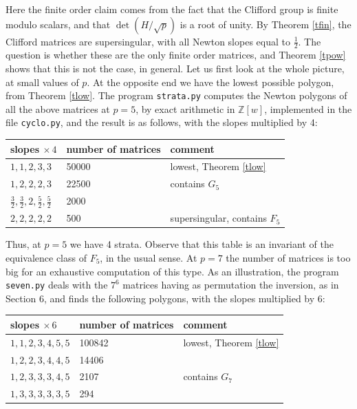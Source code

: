 \documentclass[11pt]{amsart}
\theoremstyle{definition}
\begin{document}
Here the finite order claim comes from the fact that the Clifford group is finite modulo scalars, and that $\det(H/\sqrt{p})$ is a root of unity. By Theorem \ref{tfin}, the Clifford matrices are supersingular, with all Newton slopes equal to $\frac{1}{2}$. The question is whether these are the only finite order matrices, and Theorem \ref{tpow} shows that this is not the case, in general. Let us first look at the whole picture, at small values of $p$. At the opposite end we have the lowest possible polygon, from Theorem \ref{tlow}. The program \texttt{strata.py} computes the Newton polygons of all the above matrices at $p=5$, by exact arithmetic in $\mathbb Z[w]$, implemented in the file \texttt{cyclo.py}, and the result is as follows, with the slopes multiplied by 4:
\begin{center}
\begin{tabular}[t]{|l|l|l|}
\hline
slopes $\times\,4$&number of matrices&comment\\
\hline
$1,1,2,3,3$&50000&lowest, Theorem \ref{tlow}\\
\hline
$1,2,2,2,3$&22500&contains $G_5$\\
\hline
$\frac{3}{2},\frac{3}{2},2,\frac{5}{2},\frac{5}{2}$&2000&\\
\hline
$2,2,2,2,2$&500&supersingular, contains $F_5$\\
\hline
\end{tabular}
\end{center}

\medskip

Thus, at $p=5$ we have 4 strata. Observe that this table is an invariant of the equivalence class of $F_5$, in the usual sense. At $p=7$ the number of matrices is too big for an exhaustive computation of this type. As an illustration, the program \texttt{seven.py} deals with the $7^6$ matrices having as permutation the inversion, as in Section 6, and finds the following polygons, with the slopes multiplied by 6:
\begin{center}
\begin{tabular}[t]{|l|l|l|}
\hline
slopes $\times\,6$&number of matrices&comment\\
\hline
$1,1,2,3,4,5,5$&100842&lowest, Theorem \ref{tlow}\\
\hline
$1,2,2,3,4,4,5$&14406&\\
\hline
$1,2,3,3,3,4,5$&2107&contains $G_7$\\
\hline
$1,3,3,3,3,3,5$&294&\\
\hline
\end{tabular}
\end{center}
\end{document}
